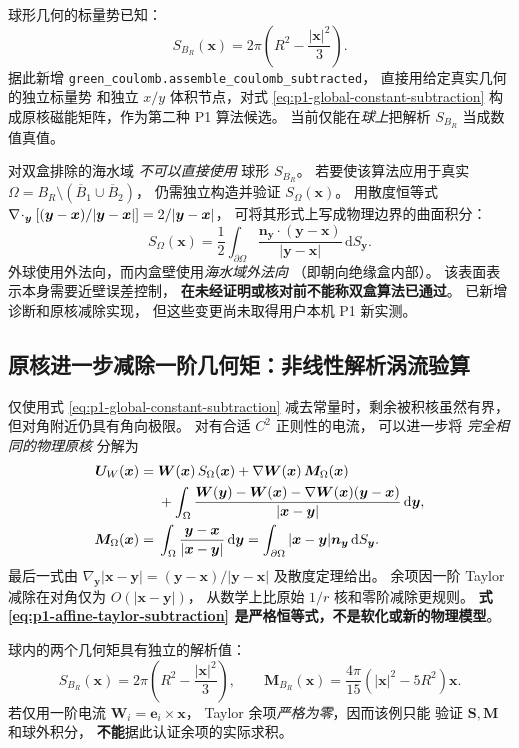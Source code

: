 球形几何的标量势已知：
\[
S_{B_R}(\bm x)=2\pi
\left(R^2-\frac{|\bm x|^2}{3}\right).
\]
据此新增
\texttt{green\_coulomb.assemble\_coulomb\_subtracted}，
直接用给定真实几何的独立标量势
和独立 $x/y$ 体积节点，对式
\eqref{eq:p1-global-constant-subtraction}
构成原核磁能矩阵，作为第二种 P1 算法候选。
当前仅能在\emph{球上}把解析
$S_{B_R}$ 当成数值真值。

对双盒排除的海水域 \emph{不可以直接使用}
球形 $S_{B_R}$。
若要使该算法应用于真实
$\Omega=B_R\setminus(\overline B_1\cup\overline B_2)$，
仍需独立构造并验证
$S_\Omega(\bm x)$。
用散度恒等式
$\nabla\!\cdot_{\bm y}[(\bm y-\bm x)/|\bm y-\bm x|]
=2/|\bm y-\bm x|$，
可将其形式上写成物理边界的曲面积分：
\[
\boxed{
S_\Omega(\bm x)=\frac12
\int_{\partial\Omega}
\frac{\bm n_{\bm y}\cdot(\bm y-\bm x)}
{|\bm y-\bm x|}\,\mathrm dS_{\bm y}.
}
\]
外球使用外法向，而内盒壁使用\emph{海水域外法向}
（即朝向绝缘盒内部）。
该表面表示本身需要近壁误差控制，
\textbf{在未经证明或核对前不能称双盒算法已通过}。
已新增诊断和原核减除实现，
但这些变更尚未取得用户本机 P1 新实测。


\subsection{原核进一步减除一阶几何矩：非线性解析涡流验算}
仅使用式 \eqref{eq:p1-global-constant-subtraction}
减去常量时，剩余被积核虽然有界，
但对角附近仍具有角向极限。
对有合适 $C^2$ 正则性的电流，
可以进一步将 \emph{完全相同的物理原核}
分解为
\begin{align}
\bm U_W(\bm x)
={}&\bm W(\bm x)\,S_\Omega(\bm x)
+\nabla\bm W(\bm x)\,\bm M_\Omega(\bm x)
\notag\\
&+
\int_\Omega
\frac{
 \bm W(\bm y)-\bm W(\bm x)
 -\nabla\bm W(\bm x)(\bm y-\bm x)}
 {|\bm x-\bm y|}\,\mathrm d\bm y ,
\label{eq:p1-affine-taylor-subtraction}\\
\bm M_\Omega(\bm x)
={}&\int_\Omega\frac{\bm y-\bm x}{|\bm x-\bm y|}
\,\mathrm d\bm y
=\int_{\partial\Omega}
 |\bm x-\bm y|\bm n_{\bm y}\,\mathrm dS_{\bm y}.
\label{eq:p1-geometry-first-moment}
\end{align}
最后一式由
$\nabla_{\bm y}|\bm x-\bm y|=
(\bm y-\bm x)/|\bm y-\bm x|$
及散度定理给出。
余项因一阶 Taylor 减除在对角仅为
$O(|\bm x-\bm y|)$，
从数学上比原始 $1/r$ 核和零阶减除更规则。
\textbf{式 \eqref{eq:p1-affine-taylor-subtraction}
是严格恒等式，不是软化或新的物理模型}。

球内的两个几何矩具有独立的解析值：
\[
S_{B_R}(\bm x)=
2\pi\left(R^2-\frac{|\bm x|^2}{3}\right),\qquad
\boxed{\bm M_{B_R}(\bm x)=
\frac{4\pi}{15}(|\bm x|^2-5R^2)\bm x.}
\]
若仅用一阶电流 $\bm W_i=\bm e_i\times\bm x$，
Taylor 余项\emph{严格为零}，因而该例只能
验证 $\bm S,\bm M$ 和球外积分，
\textbf{不能}据此认证余项的实际求积。


